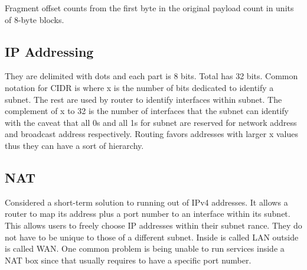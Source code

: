 Fragment offset counts from the first byte in the original payload count
in units of 8-byte blocks.
\begin{center}
\end{center}
\subsection{IP Addressing}
They are delimited with dots and each part is 8 bits. Total has 32 bits.
Common notation for CIDR is  where x is the number of
bits dedicated to identify a subnet. The rest are used by router to
identify interfaces within subnet. The complement of x to 32 is the
number of interfaces that the subnet can identify with the caveat that
all 0s and all 1s for subnet are reserved for network address and
broadcast address respectively. Routing favors addresses with larger x
values thus they can have a sort of hierarchy.
\subsection{NAT}
Considered a short-term solution to running out of IPv4 addresses. It
allows a router to map its address plus a port number to an interface
within its subnet. This allows users to freely choose IP addresses
within their subnet rance. They do not have to be unique to those of a
different subnet. Inside is called LAN outside is called WAN. One common
problem is being unable to run services inside a NAT box since that
usually requires to have a specific port number.
